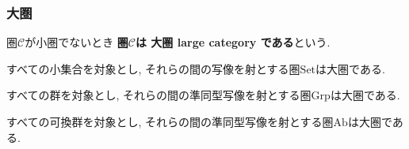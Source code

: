 \subsubsection{大圏}
\begin{Def}
圏$\mathscr{C}$が小圏でないとき
{\bf 圏$\mathscr{C}$は
大圏 large category
である}という.
\end{Def}

\begin{Prop}
すべての小集合を対象とし, それらの間の写像を射とする圏$\mathrm{Set}$は大圏である.
\end{Prop}

\begin{Prop}
すべての群を対象とし, それらの間の準同型写像を射とする圏$\mathrm{Grp}$は大圏である.
\end{Prop}
\begin{comment}
\begin{proof}
\end{proof}
\end{comment}

\begin{Prop}
すべての可換群を対象とし, それらの間の準同型写像を射とする圏$\mathrm{Ab}$は大圏である.
\end{Prop}
\begin{comment}
\begin{proof}
\end{proof}
\end{comment}

\begin{comment}
*************************
\begin{Prop}
すべての位相空間\footnote{定義を本文から外している}を対象とし, それらの間の連続写像\footnote{定義を本文から外している}を射とする圏$\mathrm{Top}$は大圏である.
\end{Prop}
\end{comment}
\begin{comment}
*************************
\begin{example}
ある体\footnote{定義を本文から外している}$k$に対して,
すべての$k$次線形空間\footnote{未定義}を対象とし,
それらの間の$k$次線形写像\footnote{未定義}を射とする
圏$\mathrm{Vect}_k$は大圏である.
\end{example}
***************************
\end{comment}

